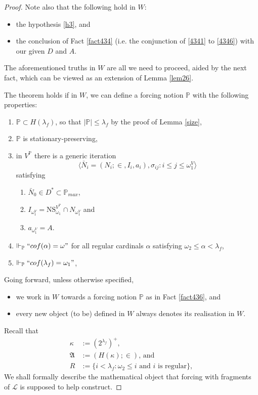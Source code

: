 \documentclass[12pt]{article}
\numberwithin{equation}{section}
\begin{document}
\begin{proof}
Note also that the following hold in $W$:
\begin{itemize}
    \item the hypothesis \ref{h3}, and
    \item the conclusion of Fact \ref{fact434} (i.e. the conjunction of \ref{4341} to \ref{4346}) with our given $D$ and $A$. 
\end{itemize}

The aforementioned truths in $W$ are all we need to proceed, aided by the next fact, which can be viewed as an extension of Lemma \ref{lem26}.

\begin{fact}\label{fact436}
The theorem holds if in $W$, we can define a forcing notion $\mathbb{P}$ with the following properties: 
\begin{enumerate}[label=(K\arabic*), leftmargin=40pt]
    \item\label{K1} $\mathbb{P} \subset H(\lambda_f)$, so that $|\mathbb{P}| \leq \lambda_f$ by the proof of Lemma \ref{size},
    \item\label{K2} $\mathbb{P}$ is stationary-preserving, 
    \item\label{K3} in $V^{\mathbb{P}}$ there is a generic iteration $$\langle \bar{N}_i = (N_i; \in, I_i, a_i), \sigma_{ij} : i \leq j \leq \omega_1^V \rangle$$ satisfying 
    \begin{enumerate}[label=(\arabic*), leftmargin=40pt]
        \item\label{k31} $\bar{N}_0 \in D^* \subset \mathbb{P}_{max}$,
        \item\label{k32} $I_{\omega_1^V} = \mathrm{NS}_{\omega_1}^{V^{\mathbb{P}}} \cap N_{\omega_1^V}$ and
        \item\label{k33} $a_{\omega_1^V} = A$.
    \end{enumerate} 
    \item\label{K4} $\Vdash_{\mathbb{P}} ``cof(\alpha) = \omega"$ for all regular cardinals $\alpha$ satisfying $\omega_2 \leq \alpha < \lambda_f$,
    \item\label{K5} $\Vdash_{\mathbb{P}} ``cof(\lambda_f) = \omega_1"$,
\end{enumerate}
\end{fact}

Going forward, unless otherwise specified, 
\begin{itemize}
    \item we work in $W$ towards a forcing notion $\mathbb{P}$ as in Fact \ref{fact436}, and
    \item every new object (to be) defined in $W$ always denotes its realisation in $W$. 
\end{itemize}
Recall that
\begin{align*}
    \kappa & := (2^{\lambda_f})^+ \text{,} \\
    \mathfrak{A} & := (H(\kappa); \in) \text{, and} \\
    R & := \{i < \lambda_f : \omega_2 \leq i \text{ and } i \text{ is regular}\},
\end{align*}
We shall formally describe the mathematical object that forcing with fragments of $\mathcal{L}$ is supposed to help construct. 


\end{proof}
\end{document}
